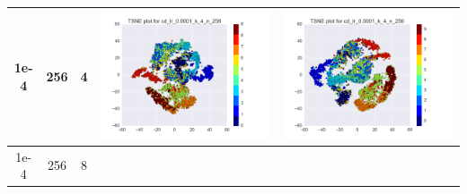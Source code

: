 \documentclass[12pt]{report}
\begin{document}
\begin{table}[H]
\begin{tabular}{ | c | c | c | c || c |}
    \\ \hline
    1e-4 & 256 & 4 &
    \begin{minipage}{.3\textwidth}
      \includegraphics[scale=0.25]{cd_lr_0_0001_k_4_n_256.png}
    \end{minipage} &
    \begin{minipage}{.3\textwidth}
      \includegraphics[scale=0.25]{test_cd_lr_0_0001_k_4_n_256.png}
    \end{minipage}
        \\ \hline
    1e-4 & 256 & 8 &
    \begin{minipage}{.3\textwidth}

\end{minipage}
\end{tabular}
\end{table}
\end{document}
